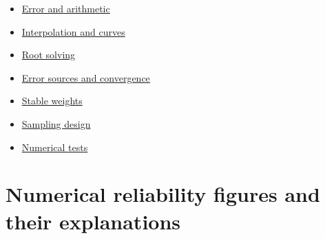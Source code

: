\begin{itemize}
\tightlist
\item
  \href{Continuous\%20Notes/Computing\%20Foundations\%20-\%20From\%20Bits\%20to\%20C++\%20and\%20Systems\%20APIs\#Floating-point\%20answers:\%20error,\%20conditioning,\%20stability,\%20and\%20stable\%20arithmetic}{Error and arithmetic}
\item
  \href{Continuous\%20Notes/Computing\%20Foundations\%20-\%20From\%20Bits\%20to\%20C++\%20and\%20Systems\%20APIs\#Reconstructing\%20values\%20and\%20curves\%20between\%20samples}{Interpolation and curves}
\item
  \href{Continuous\%20Notes/Computing\%20Foundations\%20-\%20From\%20Bits\%20to\%20C++\%20and\%20Systems\%20APIs\#Finding\%20roots\%20with\%20guarantees\%20and\%20convergence\%20checks}{Root solving}
\item
  \href{Continuous\%20Notes/Computing\%20Foundations\%20-\%20From\%20Bits\%20to\%20C++\%20and\%20Systems\%20APIs\#Separate\%20discretization,\%20truncation,\%20and\%20roundoff;\%20measure\%20convergence}{Error sources and convergence}
\item
  \href{Continuous\%20Notes/Computing\%20Foundations\%20-\%20From\%20Bits\%20to\%20C++\%20and\%20Systems\%20APIs\#Keep\%20probability\%20weights\%20stable\%20before\%20sampling}{Stable weights}
\item
  \href{Continuous\%20Notes/Computing\%20Foundations\%20-\%20From\%20Bits\%20to\%20C++\%20and\%20Systems\%20APIs\#Design\%20samples:\%20without\%20replacement,\%20stratified,\%20and\%20low-discrepancy}{Sampling design}
\item
  \href{Continuous\%20Notes/Computing\%20Foundations\%20-\%20From\%20Bits\%20to\%20C++\%20and\%20Systems\%20APIs\#Test\%20numerical\%20methods\%20and\%20benchmark\%20reproducibly}{Numerical tests}
\end{itemize}

\section{Numerical reliability figures and their explanations}\label{appendix-cb5af353ef77-numerical-reliability-figures-and-their-explanations}

